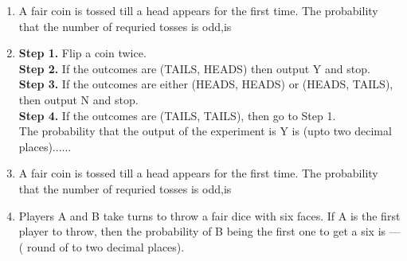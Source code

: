 \renewcommand{\theequation}{\theenumi}
\renewcommand{\thefigure}{\theenumi}
\renewcommand{\thetable}{\theenumi}
\begin{enumerate}[label=\thesection.\arabic*.,ref=\thesection.\theenumi]

%
\item A fair coin is tossed till a head appears for the first time. The probability that the number of requried tosses is odd,is
\begin{enumerate}
\end{enumerate}
%
\solution




\item \textbf{Step 1.} Flip a coin twice.\\
\textbf{Step 2.} If the outcomes are (TAILS, HEADS) then output Y and stop.\\
\textbf{Step 3.} If the outcomes are either (HEADS, HEADS) or (HEADS, TAILS), then output N and stop.\\
\textbf{Step 4.} If the outcomes are (TAILS, TAILS), then go to Step 1.\\
The probability that the output of the experiment is Y is (upto two decimal places)......
\\
%
\solution

%
\item A fair coin is tossed till a head appears for the first time. The probability that the number of requried tosses is odd,is
\begin{enumerate}
\end{enumerate}
\solution


%
\item Players A and B take turns to throw a fair dice with six faces. If A is the first player to throw, then the probability of B being the first one to get a six is --- ( round of to two decimal places). \\
\solution



\end{enumerate}
